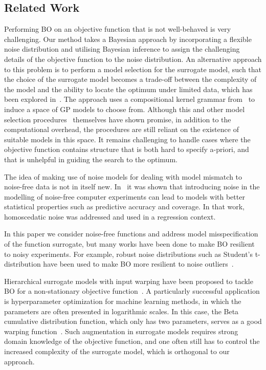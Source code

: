 \subsection{Related Work}
\label{subsection:bayesian_optimization:related_work}
Performing BO on an objective function that is not well-behaved is very challenging.
Our method takes a Bayesian approach by incorporating a flexible noise distribution and
utilising Bayesian inference to assign the challenging details of the objective function to the noise distribution.
An alternative approach to this problem is to perform a model selection for the surrogate model, such that the choice of the surrogate model becomes a trade-off between the complexity of the model and the ability to locate the optimum under limited data, which has been explored in~\parencite{malkomes_automating_2018}.
The approach uses a compositional kernel grammar from~\parencite{duvenaud_structure_2013} to induce a space of GP models to choose from.
Although this and other model selection procedures~\parencite{malkomes_bayesian_2016,duvenaud_structure_2013,grosse_exploiting_2012,gardner_discovering_2017} themselves have shown promise,
in addition to the computational overhead, the procedures are still reliant on the existence of suitable models in this space.
It remains challenging to handle cases where the objective function contains structure that is both hard to specify a-priori, and that is unhelpful in guiding the search to the optimum.

The idea of making use of noise models for dealing with model mismatch to noise-free data is not in itself new.
In~\parencite{gramacy_cases_2010} it was shown that introducing noise in the modelling of noise-free computer experiments can lead
to models with better statistical properties such as predictive accuracy and coverage.
In that work, homoscedatic noise was addressed and used in a regression context.

In this paper we consider noise-free functions and address model misspecification of the function surrogate,
but many works have been done to make BO resilient to noisy experiments.
For example, robust noise distributions such as Student's t-distribution have been used to make BO more resilient to noise outliers~\parencite{martinez-cantin_robust_2017,martinez-cantin_practical_2017}.

Hierarchical surrogate models with input warping have been proposed to tackle BO for a non-stationary objective function~\parencite{snoek_input_2014,oh_bock_2018,calandra_manifold_2016}.
A particularly successful application is hyperparameter optimization for machine learning methods, in which the parameters are often presented in logarithmic scales.
In this case, the Beta cumulative distribution function, which only has two parameters, serves as a good warping function~\parencite{snoek_input_2014}.
Such augmentation in surrogate models requires strong domain knowledge of the objective function, and one often still has to control the increased complexity of the surrogate model, which is orthogonal to our approach.

